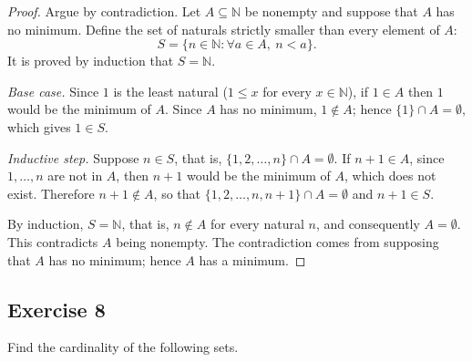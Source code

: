 \documentclass[11pt, a4paper]{article}
\begin{document}
\begin{proof}
Argue by contradiction. Let $A \subseteq \mathbb{N}$ be nonempty and suppose that $A$ has no minimum.
Define the set of naturals strictly smaller than every element of $A$:
$$ S = \{ n \in \mathbb{N} : \forall a \in A,\ n < a \}. $$
It is proved by induction that $S = \mathbb{N}$.

\textit{Base case.} Since $1$ is the least natural ($1 \le x$ for every $x \in \mathbb{N}$), if
$1 \in A$ then $1$ would be the minimum of $A$. Since $A$ has no minimum, $1 \notin A$; hence
$\{1\} \cap A = \emptyset$, which gives $1 \in S$.

\textit{Inductive step.} Suppose $n \in S$, that is, $\{1, 2, \dots, n\} \cap A = \emptyset$. If
$n+1 \in A$, since $1, \dots, n$ are not in $A$, then $n+1$ would be the minimum of $A$, which does not
exist. Therefore $n+1 \notin A$, so that $\{1, 2, \dots, n, n+1\} \cap A = \emptyset$ and
$n+1 \in S$.

By induction, $S = \mathbb{N}$, that is, $n \notin A$ for every natural $n$, and consequently
$A = \emptyset$. This contradicts $A$ being nonempty. The contradiction comes from supposing that $A$
has no minimum; hence $A$ has a minimum.
\end{proof}

\subsection*{Exercise 8}

Find the cardinality of the following sets.
\end{document}
